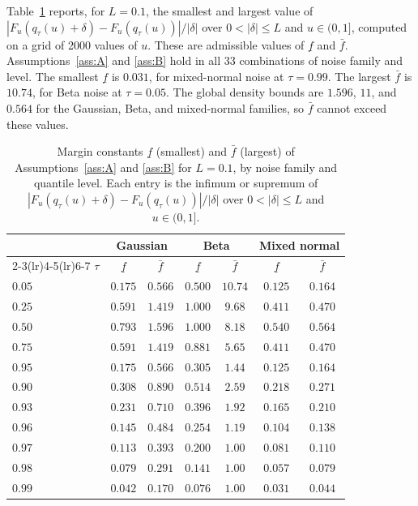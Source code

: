Table~\ref{tab:ass:margins} reports, for $L=0.1$, the smallest and largest value of $|F_u(q_\tau(u)+\delta)-F_u(q_\tau(u))|/|\delta|$ over $0<|\delta|\le L$ and $u\in(0,1]$, computed on a grid of 2000 values of $u$. These are admissible values of $\underline f$ and $\bar f$. Assumptions~\ref{ass:A} and \ref{ass:B} hold in all $33$ combinations of noise family and level. The smallest $\underline f$ is $0.031$, for mixed-normal noise at $\tau=0.99$. The largest $\bar f$ is $10.74$, for Beta noise at $\tau=0.05$. The global density bounds are $1.596$, $11$, and $0.564$ for the Gaussian, Beta, and mixed-normal families, so $\bar f$ cannot exceed these values.

\begin{table}[t]
\centering
\caption{Margin constants $\underline f$ (smallest) and $\bar f$ (largest) of Assumptions~\ref{ass:A} and \ref{ass:B} for $L=0.1$, by noise family and quantile level. Each entry is the infimum or supremum of $|F_u(q_\tau(u)+\delta)-F_u(q_\tau(u))|/|\delta|$ over $0<|\delta|\le L$ and $u\in(0,1]$.}
\label{tab:ass:margins}
\begin{tabular}{lcccccc}
\toprule
 & \multicolumn{2}{c}{Gaussian} & \multicolumn{2}{c}{Beta} & \multicolumn{2}{c}{Mixed normal}\\
\cmidrule(lr){2-3}\cmidrule(lr){4-5}\cmidrule(lr){6-7}
$\tau$ & $\underline f$ & $\bar f$ & $\underline f$ & $\bar f$ & $\underline f$ & $\bar f$\\
\midrule
$0.05$ & $0.175$ & $0.566$ & $0.500$ & $10.74$ & $0.125$ & $0.164$\\
$0.25$ & $0.591$ & $1.419$ & $1.000$ & $9.68$ & $0.411$ & $0.470$\\
$0.50$ & $0.793$ & $1.596$ & $1.000$ & $8.18$ & $0.540$ & $0.564$\\
$0.75$ & $0.591$ & $1.419$ & $0.881$ & $5.65$ & $0.411$ & $0.470$\\
$0.95$ & $0.175$ & $0.566$ & $0.305$ & $1.44$ & $0.125$ & $0.164$\\
$0.90$ & $0.308$ & $0.890$ & $0.514$ & $2.59$ & $0.218$ & $0.271$\\
$0.93$ & $0.231$ & $0.710$ & $0.396$ & $1.92$ & $0.165$ & $0.210$\\
$0.96$ & $0.145$ & $0.484$ & $0.254$ & $1.19$ & $0.104$ & $0.138$\\
$0.97$ & $0.113$ & $0.393$ & $0.200$ & $1.00$ & $0.081$ & $0.110$\\
$0.98$ & $0.079$ & $0.291$ & $0.141$ & $1.00$ & $0.057$ & $0.079$\\
$0.99$ & $0.042$ & $0.170$ & $0.076$ & $1.00$ & $0.031$ & $0.044$\\
\bottomrule
\end{tabular}
\end{table}

